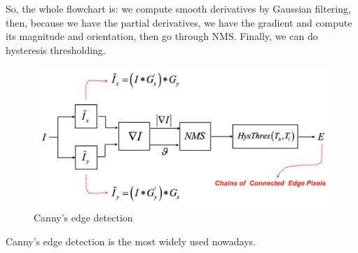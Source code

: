 \documentclass{article}
\begin{document}
So, the whole flowchart is: we compute smooth derivatives by Gaussian
filtering, then, because we have the partial derivatives, we have the
gradient and compute its magnitude and orientation, then go through NMS.
Finally, we can do hysteresis thresholding.

\begin{figure}
\centering
\includegraphics{./res/canny-edge.png}
\caption{Canny's edge detection}
\end{figure}

Canny's edge detection is the most widely used nowadays.
\end{document}
